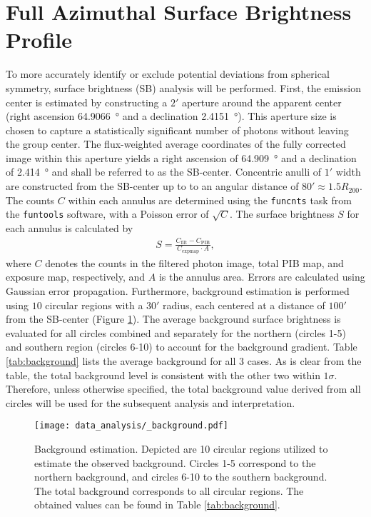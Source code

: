 \section{Full Azimuthal Surface Brightness Profile}\label{sec:full_az}
To more accurately identify or exclude potential deviations from spherical symmetry, surface brightness (SB) analysis will be performed. First, the emission center is estimated by constructing a \(2'\) aperture around the apparent center (right ascension \SI{64.9066}{\degree} and a declination \SI{2.4151}{\degree}). This aperture size is chosen to capture a statistically significant number of photons without leaving the group center. The flux-weighted average coordinates of the fully corrected image within this aperture yields a right ascension of \SI{64.909}{\degree} and a declination of \SI{2.414}{\degree} and shall be referred to as the SB-center. Concentric anulli of \(1'\) width are constructed from the SB-center up to to an angular distance of \(80' \approx 1.5R_{200}\). The counts \(C\) within each annulus are determined using the \texttt{funcnts} task from the \texttt{funtools} software, with a Poisson error of \(\sqrt{C}\). The surface brightness \(S\) for each annulus is calculated by
\begin{align*}
    S = \frac{C_\text{filt} - C_\text{PIB}}{C_\text{expmap}\cdot A},
\end{align*}
where \(C\) denotes the counts in the filtered photon image, total PIB map, and exposure map, respectively, and \(A\) is the annulus area. Errors are calculated using Gaussian error propagation. Furthermore, background estimation is performed using \(10\) circular regions with a \(30'\) radius, each centered at a distance of \(100'\) from the SB-center (Figure \ref{fig:background_circles}). The average background surface brightness is evaluated for all circles combined and separately for the northern (circles 1-5) and southern region (circles 6-10) to account for the background gradient. Table \ref{tab:background} lists the average background for all 3 cases. As is clear from the table, the total background level is consistent with the other two within \(1\sigma\). Therefore, unless otherwise specified, the total background value derived from all circles will be used for the subsequent analysis and interpretation.
%
\begin{figure}[htbp]
    \centering
    \texttt{[image: data\_analysis/\_background.pdf]}
    \caption[Circular regions for background estimation.]{Background estimation. Depicted are 10 circular regions utilized to estimate the observed background. Circles 1-5 correspond to the northern background, and circles 6-10 to the southern background. The total background corresponds to all circular regions. The obtained values can be found in Table \ref{tab:background}.}
    \label{fig:background_circles}
\end{figure}
